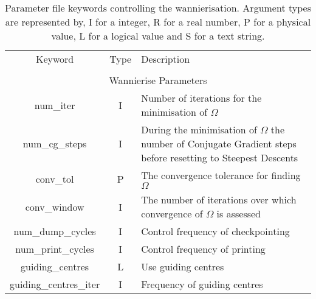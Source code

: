 \begin{table}
\begin{center}
\begin{tabular}{|c|c|p{6cm}|}
\hline
Keyword & Type & Description \\
        &      &             \\
\hline\hline
\multicolumn{3}{|c|}{Wannierise Parameters} \\
\hline
{\sc num\_iter }   & I & Number of iterations for the minimisation
of $\Omega$ \\
{\sc num\_cg\_steps }   & I & During the minimisation
of $\Omega$ the number of Conjugate Gradient steps before resetting to
Steepest Descents \\
{\sc conv\_tol }   & P &The convergence tolerance for finding $\Omega$  \\
{\sc conv\_window }   & I & The number of iterations over which
convergence of $\Omega$ is assessed \\
{\sc num\_dump\_cycles }   & I & Control frequency of checkpointing \\
{\sc num\_print\_cycles }   & I & Control frequency of printing \\
{\sc guiding\_centres }   & L & Use guiding centres \\
{\sc guiding\_centres\_iter }   & I & Frequency of guiding centres \\
\hline
\end{tabular}
\caption[Parameter file keywords controlling the Wannierise routine.]
{Parameter file keywords controlling the wannierisation.  Argument types
are represented by, I for a integer, R for a real number, P for a
physical value, L for a logical value and S for a text string.}
\label{parameter_keywords5}
\end{center}
\end{table}



